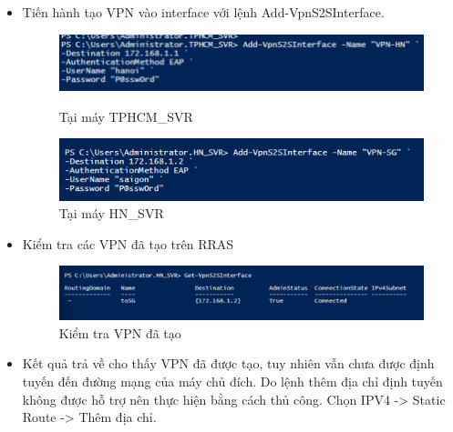 \begin{itemize}
    \item Tiến hành tạo VPN vào interface với lệnh Add-VpnS2SInterface.
    \newpage
    \begin{figure}[htbp]
        \centering
        \includegraphics[width=0.7\linewidth]{SiteToSiteImg/creat2.png}
        \caption{Tại máy TPHCM\_SVR}
        \vspace{2em}
        \includegraphics[width=0.7\linewidth]{SiteToSiteImg/creat1.png}
        \caption{Tại máy HN\_SVR}
    \end{figure}
    
    \item Kiểm tra các VPN đã tạo trên RRAS
    \begin{figure}[htbp]
            \centering
            \includegraphics[width=0.7\linewidth]{SiteToSiteImg/check.png}
            \caption{Kiểm tra VPN đã tạo}
        \end{figure}
    \item Kết quả trả về cho thấy VPN đã được tạo, tuy nhiên vẫn chưa được định tuyến đến đường mạng của máy chủ đích. Do lệnh thêm địa chỉ định tuyến không được hỗ trợ nên thực hiện bằng cách thủ công. Chọn IPV4 -> Static Route -> Thêm địa chỉ.


\end{itemize}
